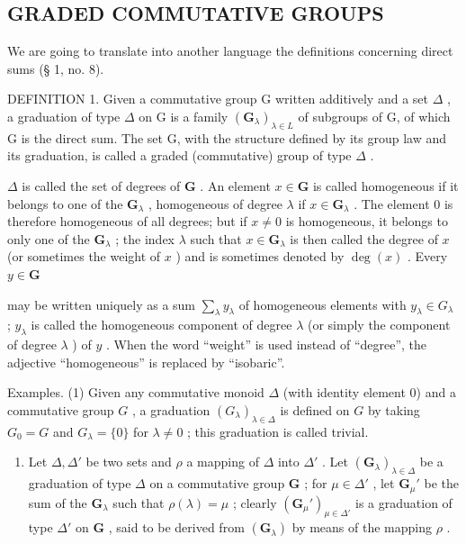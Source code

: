 \subsection{GRADED COMMUTATIVE GROUPS}

We are going to translate into another language the definitions concerning direct sums (§ 1, no. 8).

DEFINITION 1. Given a commutative group G written additively and a set \(\Delta\) , a graduation of type \(\Delta\) on G is a family \((\mathbf{G}_{\lambda})_{\lambda \in L}\) of subgroups of G, of which G is the direct sum. The set G, with the structure defined by its group law and its graduation, is called a graded (commutative) group of type \(\Delta\) .

\(\Delta\) is called the set of degrees of \(\mathbf{G}\) . An element \(x \in \mathbf{G}\) is called homogeneous if it belongs to one of the \(\mathbf{G}_{\lambda}\) , homogeneous of degree \(\lambda\) if \(x \in \mathbf{G}_{\lambda}\) . The element 0 is therefore homogeneous of all degrees; but if \(x \neq 0\) is homogeneous, it belongs to only one of the \(\mathbf{G}_{\lambda}\) ; the index \(\lambda\) such that \(x \in \mathbf{G}_{\lambda}\) is then called the degree of \(x\) (or sometimes the weight of \(x\) ) and is sometimes denoted by \(\deg(x)\) . Every \(y \in \mathbf{G}\)

may be written uniquely as a sum \(\sum_{\lambda} y_{\lambda}\) of homogeneous elements with \(y_{\lambda} \in G_{\lambda}\) ; \(y_{\lambda}\) is called the homogeneous component of degree \(\lambda\) (or simply the component of degree \(\lambda\) ) of \(y\) . When the word ``weight'' is used instead of ``degree'', the adjective ``homogeneous'' is replaced by ``isobaric''.

Examples. (1) Given any commutative monoid \(\Delta\) (with identity element 0) and a commutative group \(G\) , a graduation \((G_{\lambda})_{\lambda \in \Delta}\) is defined on \(G\) by taking \(G_0 = G\) and \(G_{\lambda} = \{0\}\) for \(\lambda \neq 0\) ; this graduation is called trivial.

\begin{enumerate}
\def\labelenumi{(\arabic{enumi})}
\setcounter{enumi}{1}
\tightlist
\item
  Let \(\Delta, \Delta'\) be two sets and \(\rho\) a mapping of \(\Delta\) into \(\Delta'\) . Let \((\mathbf{G}_{\lambda})_{\lambda \in \Delta}\) be a graduation of type \(\Delta\) on a commutative group \(\mathbf{G}\) ; for \(\mu \in \Delta'\) , let \(\mathbf{G}_{\mu}'\) be the sum of the \(\mathbf{G}_{\lambda}\) such that \(\rho(\lambda) = \mu\) ; clearly \((\mathbf{G}_{\mu}')_{\mu \in \Delta'}\) is a graduation of type \(\Delta'\) on \(\mathbf{G}\) , said to be derived from \((\mathbf{G}_{\lambda})\) by means of the mapping \(\rho\) .
\end{enumerate}

